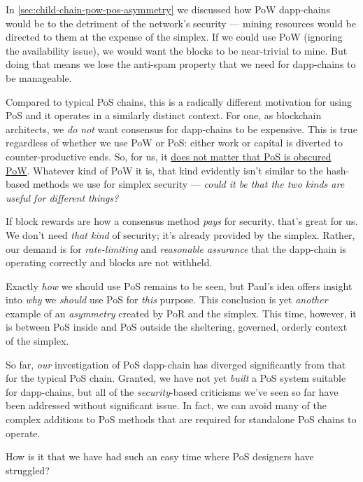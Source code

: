 In \autoref{sec:child-chain-pow-pos-asymmetry} we discussed how PoW dapp-chains would be to the detriment of the network's security --- mining resources would be directed to them at the expense of the simplex.
If we could use PoW (ignoring the availability issue), we would want the blocks to be near-trivial to mine.
But doing that means we lose the anti-spam property that we need for dapp-chains to be manageable.

Compared to typical PoS chains, this is a radically different motivation for using PoS and it operates in a similarly distinct context.
For one, as blockchain architects, we \emph{do not} want consensus for dapp-chains to be expensive.
This is true regardless of whether we use PoW or PoS: either work or capital is diverted to counter-productive ends.
So, for us, it \ul{does not matter that PoS is obscured PoW}.
Whatever kind of PoW it is, that kind evidently isn't similar to the hash-based methods we use for simplex security --- \emph{could it be that the two kinds are useful for different things?}

If block rewards are how a consensus method \emph{pays} for security, that's great for us.
We don't need \emph{that kind} of security; it's already provided by the simplex.
Rather, our demand is for \emph{rate-limiting} and \emph{reasonable assurance} that the dapp-chain is operating correctly and blocks are not withheld.

Exactly \emph{how} we should use PoS remains to be seen, but Paul's idea offers insight into \emph{why} we \emph{should} use PoS for \emph{this} purpose.
This conclusion is yet \emph{another} example of an \emph{asymmetry} created by PoR and the simplex.
This time, however, it is between PoS inside and PoS outside the sheltering, governed, orderly context of the simplex.



So far, \emph{our} investigation of PoS dapp-chain has diverged significantly from that for the typical PoS chain.
Granted, we have not yet \emph{built} a PoS system suitable for dapp-chains, but all of the \emph{security}-based criticisms we've seen so far have been addressed without significant issue.
In fact, we can avoid many of the complex additions to PoS methods that are required for standalone PoS chains to operate.

How is it that we have had such an easy time where PoS designers have struggled?

